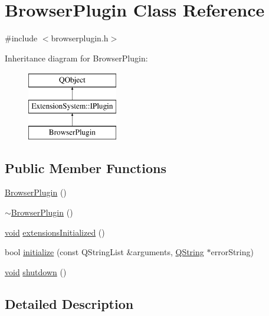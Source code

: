 \hypertarget{class_browser_plugin}{\section{Browser\-Plugin Class Reference}
\label{class_browser_plugin}
}


{\ttfamily \#include $<$browserplugin.\-h$>$}

Inheritance diagram for Browser\-Plugin\-:\begin{figure}[H]
\begin{center}
\leavevmode
\includegraphics[height=3.000000cm]{class_browser_plugin}
\end{center}
\end{figure}
\subsection*{Public Member Functions}
\begin{DoxyCompactItemize}
\item 
\hyperlink{group___u_a_v_object_browser_plugin_ga63db697e4bb11742d9d946ca7c08fb7a}{Browser\-Plugin} ()
\item 
\hyperlink{group___u_a_v_object_browser_plugin_ga35e9b6db09f29a19459f9012c2251980}{$\sim$\-Browser\-Plugin} ()
\item 
\hyperlink{group___u_a_v_objects_plugin_ga444cf2ff3f0ecbe028adce838d373f5c}{void} \hyperlink{group___u_a_v_object_browser_plugin_gabd7f5c6dac73c173cebd4e59dbc99182}{extensions\-Initialized} ()
\item 
bool \hyperlink{group___u_a_v_object_browser_plugin_gac452314c7c28ab0c1fb1bb935bed5d0d}{initialize} (const Q\-String\-List \&arguments, \hyperlink{group___u_a_v_objects_plugin_gab9d252f49c333c94a72f97ce3105a32d}{Q\-String} $\ast$error\-String)
\item 
\hyperlink{group___u_a_v_objects_plugin_ga444cf2ff3f0ecbe028adce838d373f5c}{void} \hyperlink{group___u_a_v_object_browser_plugin_ga8d7b6113315a8625ce56679504594fa3}{shutdown} ()
\end{DoxyCompactItemize}


\subsection{Detailed Description}


